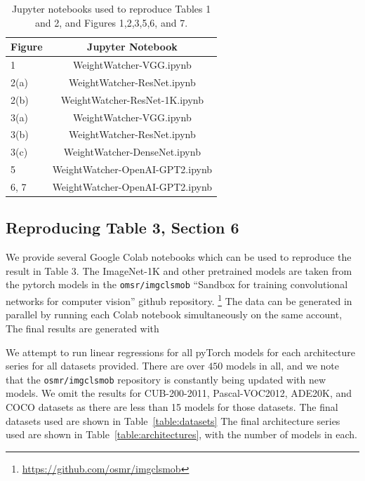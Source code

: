 \begin{table}[t]
\small
\begin{center}
\begin{tabular}{|p{1in}|c|}
\hline
Figure & Jupyter Notebook \\
\hline
1  &  WeightWatcher-VGG.ipynb \\
2(a)  &  WeightWatcher-ResNet.ipynb \\
2(b)  &  WeightWatcher-ResNet-1K.ipynb \\
3(a)  &  WeightWatcher-VGG.ipynb \\
3(b)  &  WeightWatcher-ResNet.ipynb \\
3(c)  &  WeightWatcher-DenseNet.ipynb \\
\hline
5 & WeightWatcher-OpenAI-GPT2.ipynb \\
6, 7 & WeightWatcher-OpenAI-GPT2.ipynb \\
\hline
\end{tabular}
\end{center}
\caption{Jupyter notebooks used to reproduce Tables 1 and 2, and Figures 1,2,3,5,6, and 7.}
\label{table:notebooks}
\end{table}

\subsection{Reproducing Table 3, Section 6}

We provide several Google Colab notebooks which can be used to reproduce the result in Table 3.
The ImageNet-1K and other pretrained models are taken from the pytorch models in the \texttt{omsr/imgclsmob} 
``Sandbox for training convolutional networks for computer vision'' github repository.
\footnote{\url{https://github.com/osmr/imgclsmob}}
The data can be generated in parallel by running each Colab notebook simultaneously on the same account,
The final results are generated with 

We attempt to run linear regressions for all pyTorch models for each architecture series for all datasets provided.  
There are over $450$ models in all, and we note that the \texttt{osmr/imgclsmob} repository is constantly being updated with new models.
We omit the results for CUB-200-2011, Pascal-VOC2012, ADE20K, and COCO datasets as there are less than 15 models
for those datasets. The final datasets used are shown in Table~\ref{table:datasets}
The final architecture series used are shown in  Table~\ref{table:architectures}, with the number of models in each.

